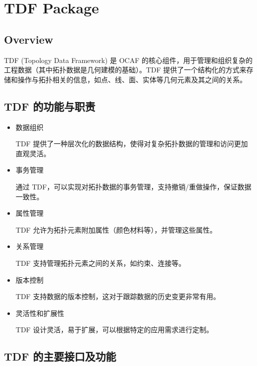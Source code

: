 \documentclass[11pt]{article}
\begin{document}
\section{TDF Package}
\label{sec:orgbb2164b}

\subsection{Overview}
\label{sec:org4a7fd89}

TDF (Topology Data Framework) 是 OCAF 的核心组件，用于管理和组织复杂的工程数据（其中拓扑数据是几何建模的基础）。TDF 提供了一个结构化的方式来存储和操作与拓扑相关的信息，如点、线、面、实体等几何元素及其之间的关系。
\subsection{TDF 的功能与职责}
\label{sec:orgfb50402}

\begin{itemize}
\item 数据组织

TDF 提供了一种层次化的数据结构，使得对复杂拓扑数据的管理和访问更加直观灵活。

\item 事务管理

通过 TDF，可以实现对拓扑数据的事务管理，支持撤销/重做操作，保证数据一致性。

\item 属性管理

TDF 允许为拓扑元素附加属性（颜色材料等），并管理这些属性。

\item 关系管理

TDF 支持管理拓扑元素之间的关系，如约束、连接等。

\item 版本控制

TDF 支持数据的版本控制，这对于跟踪数据的历史变更非常有用。

\item 灵活性和扩展性

TDF 设计灵活，易于扩展，可以根据特定的应用需求进行定制。
\end{itemize}
\subsection{TDF 的主要接口及功能}
\label{sec:orga4b2c2a}
\end{document}
